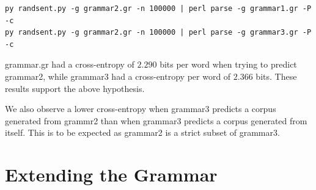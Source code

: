 \documentclass[11pt]{article}
\begin{document}
\begin{verbatim}
py randsent.py -g grammar2.gr -n 100000 | perl parse -g grammar1.gr -P -c
py randsent.py -g grammar2.gr -n 100000 | perl parse -g grammar3.gr -P -c
\end{verbatim}

grammar.gr had a cross-entropy of $2.290$ bits per word when trying to predict grammar2, while grammar3 had a cross-entropy per word of $2.366$ bits. These results support the above hypothesis.

We also observe a lower cross-entropy when grammar3 predicts a corpus generated from grammr2 than when grammar3 predicts a corpus generated from itself. This is to be expected as grammar2 is a strict subset of grammar3.

\section{Extending the Grammar}
\end{document}
